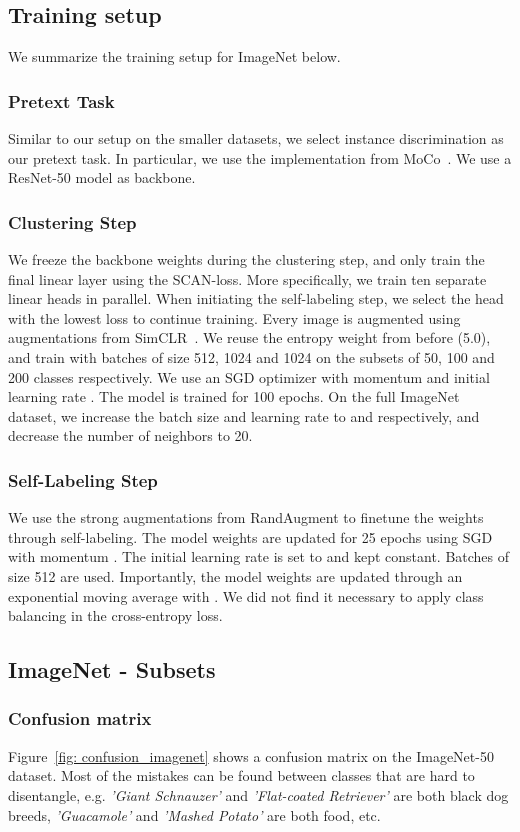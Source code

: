 \documentclass[runningheads]{llncs}
\begin{document}
\subsection{Training setup}
We summarize the training setup for ImageNet below.

\subsubsection{Pretext Task}
Similar to our setup on the smaller datasets, we select instance discrimination as our pretext task. In particular, we use the implementation from MoCo~\cite{chen2020improved}. We use a ResNet-50 model as backbone. 

\subsubsection{Clustering Step}
We freeze the backbone weights during the clustering step, and only train the final linear layer using the SCAN-loss. More specifically, we train ten separate linear heads in parallel. When initiating the self-labeling step, we select the head with the lowest loss to continue training. Every image is augmented using augmentations from SimCLR~\cite{chen2020simple}. We reuse the entropy weight from before (5.0), and train with batches of size 512, 1024 and 1024 on the subsets of 50, 100 and 200 classes respectively. We use an SGD optimizer with momentum  and initial learning rate . The model is trained for 100 epochs. On the full ImageNet dataset, we increase the batch size and learning rate to  and  respectively, and decrease the number of neighbors to 20.

\subsubsection{Self-Labeling Step}
We use the strong augmentations from RandAugment to finetune the weights through self-labeling. The model weights are updated for 25 epochs using SGD with momentum . The initial learning rate is set to  and kept constant. Batches of size 512 are used. Importantly, the model weights are updated through an exponential moving average with . We did not find it necessary to apply class balancing in the cross-entropy loss. 

\subsection{ImageNet - Subsets}
\subsubsection{Confusion matrix}
Figure~\ref{fig: confusion_imagenet} shows a confusion matrix on the ImageNet-50 dataset. Most of the mistakes can be found between classes that are hard to disentangle, e.g. \textit{'Giant Schnauzer'} and \textit{'Flat-coated Retriever'} are both black dog breeds, \textit{'Guacamole'} and \textit{'Mashed Potato'} are both food, etc. 
\end{document}
